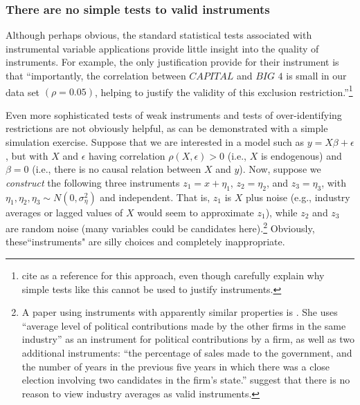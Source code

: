 \documentclass[11pt]{amsart}
\begin{document}
\subsubsection{There are no simple tests to valid instruments}
Although perhaps obvious, the standard statistical tests associated with instrumental variable applications provide little insight into the quality of instruments. 
For example, the only justification \citet{Guedhami:2013cj} provide for their instrument is that ``importantly, the correlation between $\textit{CAPITAL}$ and $\textit{BIG 4}$ is small in our data set $(\rho = 0.05)$, helping to justify the validity of this exclusion restriction.''\footnote{
 \citet{Guedhami:2013cj} cite \citet{Larcker:2010fq} as a reference for this approach, even though \citet{Larcker:2010fq} carefully explain why simple tests like this cannot be used to justify instruments.}

Even more sophisticated tests of weak instruments and tests of over-identifying restrictions are not obviously helpful, as can be demonstrated with a simple simulation exercise.
Suppose that we are interested in a model such as $y = X \beta + \epsilon$, but with $X$ and $\epsilon$ having correlation $\rho(X, \epsilon) > 0$ (i.e., $X$ is endogenous) and $\beta = 0$ (i.e., there is no causal relation between $X$ and $y$). 
Now, suppose we \emph{construct} the following three instruments 
$z_1 = x +\eta_1$, $z_2 = \eta_2$, and $z_3 = \eta_3$, with $\eta_1, \eta_2,  \eta_3 \sim N(0, \sigma_{\eta}^2)$ and independent. 
That is, $z_1$ is $X$ plus noise (e.g., industry averages or lagged values of $X$ would seem to approximate $z_1$), while $z_2$ and $z_3$ are random noise (many variables could be candidates here).\footnote{A paper using instruments with apparently similar properties is \citet{Correia:2014fp}. 
She uses ``average level of political contributions made by the other firms in the same industry'' as an instrument for political contributions by a firm, as well as two additional instruments: ``the percentage of sales made to the government, and the number of years in the previous five years in which there was a close election involving two candidates in the firm's state.''  \citet{Reiss:2007ej} suggest that there is no reason to view industry averages as valid instruments.}
Obviously, these``instruments" are silly choices and completely inappropriate.
\end{document}
